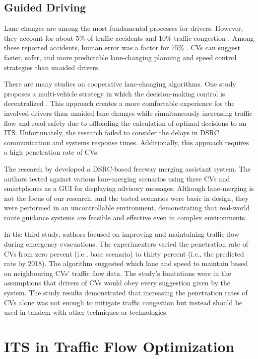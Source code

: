 \subsection{Guided Driving}
Lane changes are among the most fundamental processes for drivers. However, they account for about 5\% of traffic accidents \cite{Ni2020} and 10\% traffic congestion \cite{Ni2020}. Among these reported accidents, human error was a factor for 75\% \cite{Ni2020}. CVs can suggest faster, safer, and more predictable lane-changing planning and speed control strategies than unaided drivers. 

There are many studies on cooperative lane-changing algorithms. One study proposes a multi-vehicle strategy in which the decision-making control is decentralized \cite{Ni2020}. This approach creates a more comfortable experience for the involved drivers than unaided lane changes while simultaneously increasing traffic flow and road safety due to offloading the calculation of optimal decisions to an \acrshort{ITS}. Unfortunately, the research failed to consider the delays in \acrshort{DSRC} communication and systems response times. Additionally, this approach requires a high penetration rate of CVs. 

The research by \cite{Ahmed2017} developed a \acrshort{DSRC}-based freeway merging assistant system. The authors tested against various lane-merging scenarios using three CVs and smartphones as a \acrshort{GUI} for displaying advisory messages. Although lane-merging is not the focus of our research, and the tested scenarios were basic in design, they were performed in an uncontrollable environment, demonstrating that real-world route guidance systems are feasible and effective even in complex environments.

In the third study, authors \cite{Bahaaldin2017} focused on improving and maintaining traffic flow during emergency evacuations. The experimenters varied the penetration rate of CVs from zero percent (i.e., base scenario) to thirty percent (i.e., the predicted rate by 2018). The algorithm suggested which lane and speed to maintain based on neighbouring CVs' traffic flow data. The study's limitations were in the assumptions that drivers of CVs would obey every suggestion given by the system. The study results demonstrated that increasing the penetration rates of CVs alone was not enough to mitigate traffic congestion but instead should be used in tandem with other techniques or technologies. 


\section{\acrshort{ITS} in Traffic Flow Optimization}
